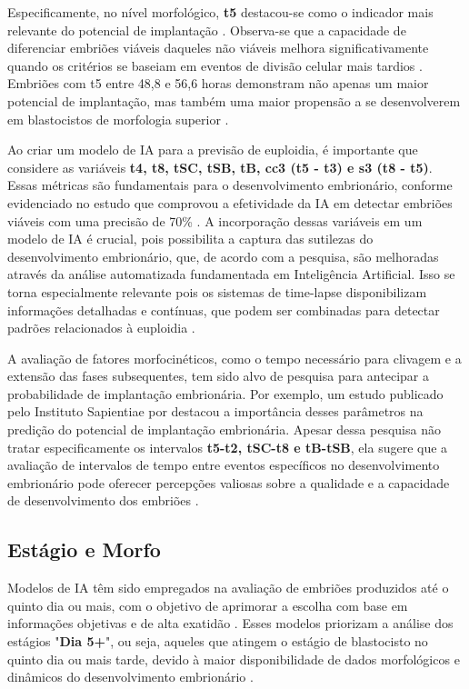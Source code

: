Especificamente, no nível morfológico, \textbf{t5} destacou-se como o indicador mais relevante do potencial de implantação \cite{cruz2012}. Observa-se que a capacidade de diferenciar embriões viáveis daqueles não viáveis melhora significativamente quando os critérios se baseiam em eventos de divisão celular mais tardios \cite{cruz2012}. Embriões com t5 entre 48,8 e 56,6 horas demonstram não apenas um maior potencial de implantação, mas também uma maior propensão a se desenvolverem em blastocistos de morfologia superior \cite{cruz2012}.

Ao criar um modelo de IA para a previsão de euploidia, é importante que considere as variáveis \textbf{t4, t8, tSC, tSB, tB, cc3 (t5 - t3) e s3 (t8 - t5)}. Essas métricas são fundamentais para o desenvolvimento embrionário, conforme evidenciado no estudo que comprovou a efetividade da IA em detectar embriões viáveis com uma precisão de 70\% \cite{rienzi2020}. A incorporação dessas variáveis em um modelo de IA é crucial, pois possibilita a captura das sutilezas do desenvolvimento embrionário, que, de acordo com a pesquisa, são melhoradas através da análise automatizada fundamentada em Inteligência Artificial. Isso se torna especialmente relevante pois os sistemas de time-lapse disponibilizam informações detalhadas e contínuas, que podem ser combinadas para detectar padrões relacionados à euploidia \cite{rienzi2020}.

A avaliação de fatores morfocinéticos, como o tempo necessário para clivagem e a extensão das fases subsequentes, tem sido alvo de pesquisa para antecipar a probabilidade de implantação embrionária. Por exemplo, um estudo publicado pelo Instituto Sapientiae por  destacou a importância desses parâmetros na predição do potencial de implantação embrionária. Apesar dessa pesquisa não tratar especificamente os intervalos \textbf{t5-t2, tSC-t8 e tB-tSB}, ela sugere que a avaliação de intervalos de tempo entre eventos específicos no desenvolvimento embrionário pode oferecer percepções valiosas sobre a qualidade e a capacidade de desenvolvimento dos embriões \cite{desai2019}.

\subsection{Estágio e Morfo}

Modelos de IA têm sido empregados na avaliação de embriões produzidos até o quinto dia ou mais, com o objetivo de aprimorar a escolha com base em informações objetivas e de alta exatidão \cite{lassen2022}. Esses modelos priorizam a análise dos estágios "\textbf{Dia 5+}", ou seja, aqueles que atingem o estágio de blastocisto no quinto dia ou mais tarde, devido à maior disponibilidade de dados morfológicos e dinâmicos do desenvolvimento embrionário \cite{lassen2022}. 

